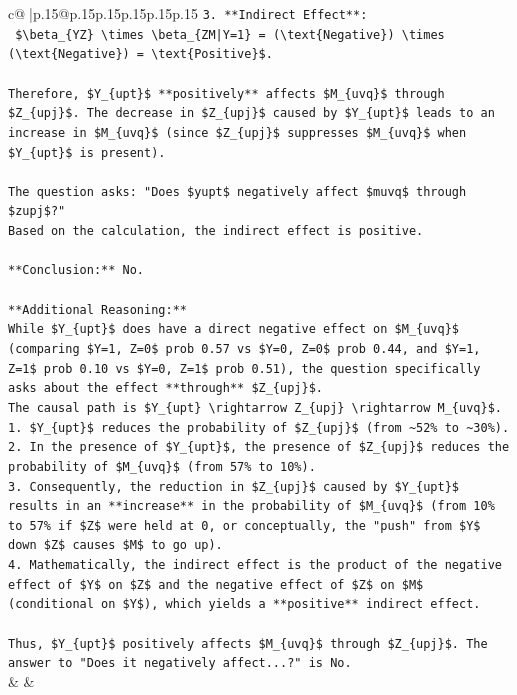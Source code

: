 \documentclass{article}
\begin{document}
{\begin{supertabular}{c@{$\;$}|p{.15\linewidth}@{}p{.15\linewidth}p{.15\linewidth}p{.15\linewidth}p{.15\linewidth}p{.15\linewidth}}
{{{\texttt{3.  **Indirect Effect**:} \\
\texttt{    \$\textbackslash{}beta\_\{YZ\} \textbackslash{}times \textbackslash{}beta\_\{ZM|Y=1\} = (\textbackslash{}text\{Negative\}) \textbackslash{}times (\textbackslash{}text\{Negative\}) = \textbackslash{}text\{Positive\}\$.} \\
\\ 
\texttt{Therefore, \$Y\_\{upt\}\$ **positively** affects \$M\_\{uvq\}\$ through \$Z\_\{upj\}\$. The decrease in \$Z\_\{upj\}\$ caused by \$Y\_\{upt\}\$ leads to an increase in \$M\_\{uvq\}\$ (since \$Z\_\{upj\}\$ suppresses \$M\_\{uvq\}\$ when \$Y\_\{upt\}\$ is present).} \\
\\ 
\texttt{The question asks: "Does \$yupt\$ negatively affect \$muvq\$ through \$zupj\$?"} \\
\texttt{Based on the calculation, the indirect effect is positive.} \\
\\ 
\texttt{**Conclusion:** No.} \\
\\ 
\texttt{**Additional Reasoning:**} \\
\texttt{While \$Y\_\{upt\}\$ does have a direct negative effect on \$M\_\{uvq\}\$ (comparing \$Y=1, Z=0\$ prob 0.57 vs \$Y=0, Z=0\$ prob 0.44, and \$Y=1, Z=1\$ prob 0.10 vs \$Y=0, Z=1\$ prob 0.51), the question specifically asks about the effect **through** \$Z\_\{upj\}\$.} \\
\texttt{The causal path is \$Y\_\{upt\} \textbackslash{}rightarrow Z\_\{upj\} \textbackslash{}rightarrow M\_\{uvq\}\$.} \\
\texttt{1.  \$Y\_\{upt\}\$ reduces the probability of \$Z\_\{upj\}\$ (from \textasciitilde{}52\% to \textasciitilde{}30\%).} \\
\texttt{2.  In the presence of \$Y\_\{upt\}\$, the presence of \$Z\_\{upj\}\$ reduces the probability of \$M\_\{uvq\}\$ (from 57\% to 10\%).} \\
\texttt{3.  Consequently, the reduction in \$Z\_\{upj\}\$ caused by \$Y\_\{upt\}\$ results in an **increase** in the probability of \$M\_\{uvq\}\$ (from 10\% to 57\% if \$Z\$ were held at 0, or conceptually, the "push" from \$Y\$ down \$Z\$ causes \$M\$ to go up).} \\
\texttt{4.  Mathematically, the indirect effect is the product of the negative effect of \$Y\$ on \$Z\$ and the negative effect of \$Z\$ on \$M\$ (conditional on \$Y\$), which yields a **positive** indirect effect.} \\
\\ 
\texttt{Thus, \$Y\_\{upt\}\$ positively affects \$M\_\{uvq\}\$ through \$Z\_\{upj\}\$. The answer to "Does it negatively affect...?" is No.} \\
            }
        }
    }
    & & \\ \\


\end{supertabular}}
\end{document}
